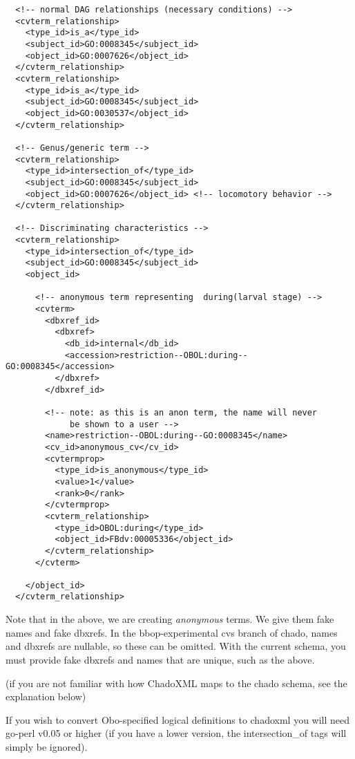 \begin{verbatim}
  <!-- normal DAG relationships (necessary conditions) -->
  <cvterm_relationship>
    <type_id>is_a</type_id>
    <subject_id>GO:0008345</subject_id>
    <object_id>GO:0007626</object_id>
  </cvterm_relationship>
  <cvterm_relationship>
    <type_id>is_a</type_id>
    <subject_id>GO:0008345</subject_id>
    <object_id>GO:0030537</object_id>
  </cvterm_relationship>

  <!-- Genus/generic term -->
  <cvterm_relationship>
    <type_id>intersection_of</type_id>
    <subject_id>GO:0008345</subject_id>
    <object_id>GO:0007626</object_id> <!-- locomotory behavior -->
  </cvterm_relationship>

  <!-- Discriminating characteristics -->
  <cvterm_relationship>
    <type_id>intersection_of</type_id>
    <subject_id>GO:0008345</subject_id>
    <object_id>

      <!-- anonymous term representing  during(larval stage) -->
      <cvterm>
        <dbxref_id>
          <dbxref>
            <db_id>internal</db_id>
            <accession>restriction--OBOL:during--GO:0008345</accession>
          </dbxref>
        </dbxref_id>

        <!-- note: as this is an anon term, the name will never
             be shown to a user -->
        <name>restriction--OBOL:during--GO:0008345</name>
        <cv_id>anonymous_cv</cv_id>
        <cvtermprop>
          <type_id>is_anonymous</type_id>
          <value>1</value>
          <rank>0</rank>
        </cvtermprop>
        <cvterm_relationship>
          <type_id>OBOL:during</type_id>
          <object_id>FBdv:00005336</object_id>
        </cvterm_relationship>
      </cvterm>

    </object_id>
  </cvterm_relationship>

\end{verbatim}

Note that in the above, we are creating {\em anonymous} terms. We give
them fake names and fake dbxrefs. In the bbop-experimental cvs branch
of chado, names and dbxrefs are nullable, so these can be
omitted. With the current schema, you must provide fake dbxrefs and
names that are unique, such as the above.

(if you are not familiar with how ChadoXML maps to the chado schema,
see the explanation below)

If you wish to convert Obo-specified logical definitions to chadoxml
you will need go-perl v0.05 or higher (if you have a lower version,
the intersection\_of tags will simply be ignored).


